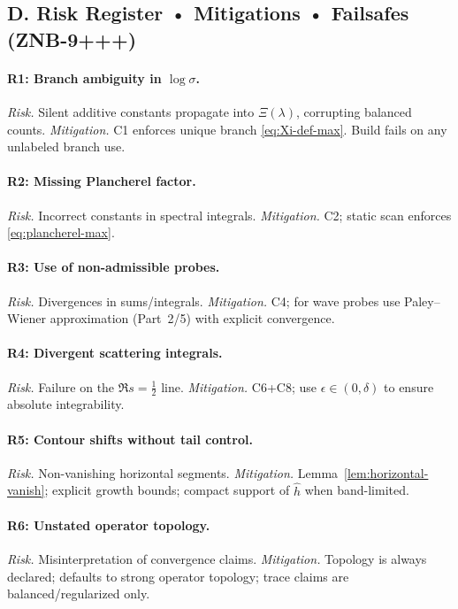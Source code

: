 
\subsection*{D. Risk Register • Mitigations • Failsafes (ZNB-9+++)}
\label{subsec:risk-register-max}

\paragraph{R1: Branch ambiguity in $\log\sigma$.}
\emph{Risk.} Silent additive constants propagate into $\Xi(\lambda)$, corrupting balanced counts. 
\emph{Mitigation.} C1 enforces unique branch \eqref{eq:Xi-def-max}. Build fails on any unlabeled branch use.

\paragraph{R2: Missing Plancherel factor.}
\emph{Risk.} Incorrect constants in spectral integrals.
\emph{Mitigation.} C2; static scan enforces \eqref{eq:plancherel-max}.

\paragraph{R3: Use of non-admissible probes.}
\emph{Risk.} Divergences in sums/integrals.
\emph{Mitigation.} C4; for wave probes use Paley–Wiener approximation (Part~2/5) with explicit convergence.

\paragraph{R4: Divergent scattering integrals.}
\emph{Risk.} Failure on the $\Re s=\tfrac12$ line.
\emph{Mitigation.} C6+C8; use $\epsilon\in(0,\delta)$ to ensure absolute integrability.

\paragraph{R5: Contour shifts without tail control.}
\emph{Risk.} Non-vanishing horizontal segments.
\emph{Mitigation.} Lemma~\ref{lem:horizontal-vanish}; explicit growth bounds; compact support of $\hat h$ when band-limited.

\paragraph{R6: Unstated operator topology.}
\emph{Risk.} Misinterpretation of convergence claims.
\emph{Mitigation.} Topology is always declared; defaults to strong operator topology; trace claims are balanced/regularized only.

